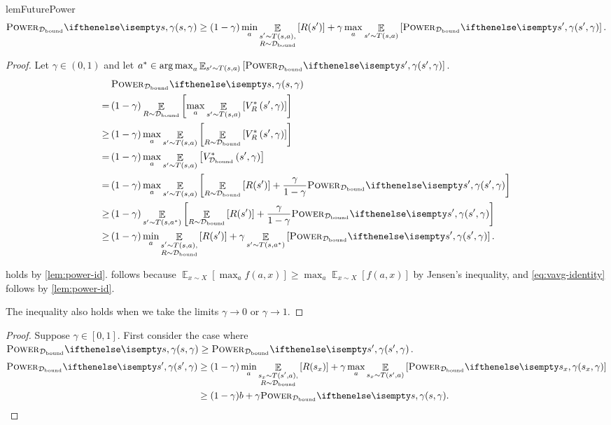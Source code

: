 \documentclass{article}
\newcommand*{\prn}[1]{\left(#1\right)}
\newcommand*{\brx}[1]{\left[#1\right]}
\DeclareMathOperator*{\argmax}{arg\,max}
\newcommand*{\D}{\mathcal{D}} %
\newcommand*{\Dbd}{\D_{\text{bound}}}
\DeclareMathOperator*{\opE}{\mathbb{E}}
\newcommand*{\E}[2]{\opE_{#1}\brx{#2}} %
\theoremstyle{definition}
\newcommand*{\R}[1][]{\mathcal{R}_\text{#1}} %
\begin{document}
\begin{appendices}
\begin{restatable}{lem}{FuturePower}\label{lem:future-power}
\begin{align}
\pwr[s,\gamma]\geq (1-\gamma)\min_a \E{\substack{s'\sim T(s,a),\\R\sim\Dbd}}{R(s')} + \gamma\max_a \E{s'\sim T(s,a)}{\pwr[s',\gamma]}.
\end{align}
\end{restatable}
\begin{proof} 
Let $\gamma \in (0,1)$ and let $a^*\in \argmax_a \E{s'\sim T\prn{s,a}}{\pwr[s',\gamma]}$.
\begin{align}
    &\pwr[s,\gamma]\\
    =\,&(1-\gamma)\E{R\sim\Dbd}{\max_a \E{s'\sim T\prn{s,a}}{\OptVf{s',\gamma}}}\label{eq:pwr-id-app}\\
    \geq\,& (1-\gamma) \max_a \E{s'\sim T\prn{s,a}}{\E{R\sim\Dbd}{\OptVf{s',\gamma}}}\label{eq:max-expect-ineq}\\
    =\,&(1-\gamma)\max_a \E{s'\sim T\prn{s,a}}{\vavg[s',\gamma]}\\
    =\,&(1-\gamma) \max_a \E{s'\sim T\prn{s,a}}{\E{R\sim \Dbd}{R(s')}+\frac{\gamma}{1-\gamma}\pwr[s',\gamma]}\label{eq:vavg-identity}\\
    \geq\,&(1-\gamma) \E{s'\sim T\prn{s,a^*}}{\E{R\sim \Dbd}{R(s')}+\frac{\gamma}{1-\gamma}\pwr[s',\gamma]}\\
    \geq\,&(1-\gamma)\min_a \E{\substack{s'\sim T(s,a),\\R\sim\Dbd}}{R(s')} + \gamma \E{s'\sim T\prn{s,a^*}}{\pwr[s',\gamma]}.\label{eq:min-reward-max-power}
\end{align}

 holds by \cref{lem:power-id}.  follows because $\E{x\sim X}{\max_a f(a,x)}\geq \max_a \E{x\sim X}{f(a,x)}$ by Jensen's inequality, and \cref{eq:vavg-identity} follows by \cref{lem:power-id}. 

The inequality also holds when we take the limits  $\gamma \to 0$ or $\gamma \to 1$.
\end{proof}

\smooth*
\begin{proof}
Suppose $\gamma\in[0,1]$. First consider the case where $\pwr[s,\gamma]\geq \pwr[s',\gamma]$.
\begin{align}
\pwr[s',\gamma]&\geq (1-\gamma)\min_a \E{\substack{s_x\sim T(s',a),\\R\sim\Dbd}}{R(s_x)} + \gamma\max_a \E{s_x\sim T(s',a)}{\pwr[s_x,\gamma]}\label{eq:lb-pwr-next}\\
&\geq (1-\gamma)b + \gamma \pwr[s,\gamma].\label{eq:lb-pwr-next-min}
\end{align}


\end{proof}
\end{appendices}
\end{document}
